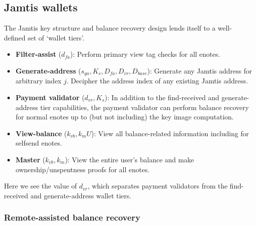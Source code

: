 \subsection{Jamtis wallets}
\label{subsec:jamtis-wallets}

The Jamtis key structure and balance recovery design lends itself to a well-defined set of `wallet tiers'.

\begin{itemize}
    \item \textbf{Filter-assist} ($d_{fa}$): Perform primary view tag checks for all enotes.

    \item \textbf{Generate-address} ($s_{ga}, K_s, D_{fa}, D_{vr}, D_{base}$): Generate any Jamtis address for arbitrary index $j$. Decipher the address index of any existing Jamtis address.

    \item \textbf{Payment validator} ($d_{vr}, K_s$): In addition to the find-received and generate-address tier capabilities, the payment validator can perform balance recovery for normal enotes up to (but not including) the key image computation.

    \item \textbf{View-balance} ($k_{vb}, k_m U$): View all balance-related information including for selfsend enotes.

    \item \textbf{Master} ($k_{vb}, k_m$): View the entire user's balance and make ownership/unspentness proofs for all enotes.
\end{itemize}

Here we see the value of $d_{vr}$, which separates payment validators from the find-received and generate-address wallet tiers.

\subsubsection{Remote-assisted balance recovery}
\label{subsubsec:jamtis-wallets-remote-assisted}

